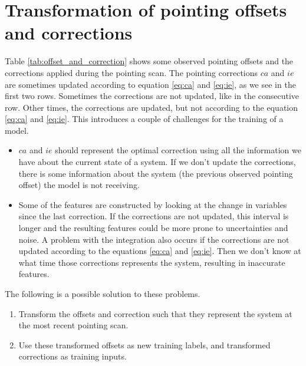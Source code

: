 \section{Transformation of pointing offsets and corrections}
Table \ref{tab:offset_and_correction} shows some observed pointing offsets and the corrections applied during the pointing scan.
The pointing corrections $ca$ and $ie$ are sometimes updated according to equation \eqref{eq:ca} and \eqref{eq:ie},
as we see in the first two rows. Sometimes the corrections are not updated, like in the consecutive row. Other times, the corrections are updated, but not according to the equation \eqref{eq:ca} and \eqref{eq:ie}.
This introduces a couple of challenges for the training of a model.
\begin{itemize}
    \item $ca$ and $ie$ should represent the optimal correction using all the information we have about the current state of a system.
    If we don't update the corrections, there is some information about the system (the previous observed pointing offset) the model is not receiving.
    \item Some of the features are constructed by looking at the change in variables since the last correction.
    If the corrections are not updated, this interval is longer and the resulting features could be more prone to uncertainties and noise.
    A problem with the integration also occurs if the corrections are not updated according to the equations \eqref{eq:ca} and \eqref{eq:ie}.
    Then we don't know at what time those corrections represents the system, resulting in inaccurate features.
\end{itemize}


The following is a possible solution to these problems.
\begin{enumerate}
    \item Transform the offsets and correction such that they represent the system at the most recent pointing scan.
    \item Use these transformed offsets as new training labels, and transformed corrections as training inputs.
\end{enumerate}

